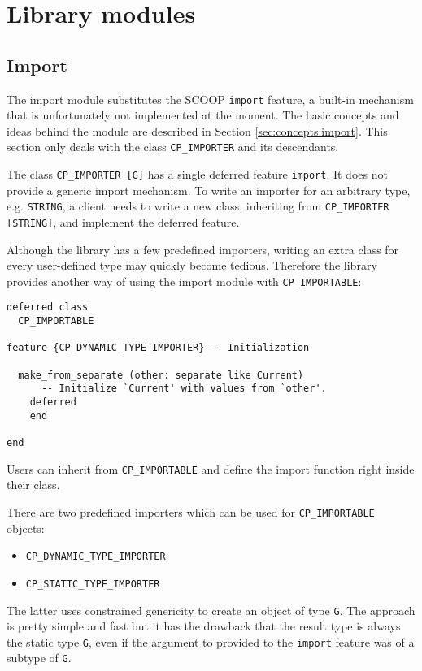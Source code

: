 \section{Library modules}
\label{sec:modules}

\subsection{Import}
\label{sec:modules:import}

The import module substitutes the SCOOP \lstinline!import! feature, a built-in mechanism that is unfortunately not implemented at the moment.
The basic concepts and ideas behind the module are described in Section \ref{sec:concepts:import}.
This section only deals with the class \lstinline!CP_IMPORTER! and its descendants.

The class \lstinline!CP_IMPORTER [G]! has a single deferred feature \lstinline!import!.
It does not provide a generic import mechanism.
To write an importer for an arbitrary type, e.g. \lstinline!STRING!, a client needs to write a new class, inheriting from \lstinline!CP_IMPORTER [STRING]!, and implement the deferred feature.

Although the library has a few predefined importers, writing an extra class for every user-defined type may quickly become tedious.
Therefore the library provides another way of using the import module with \lstinline!CP_IMPORTABLE!:

\begin{lstlisting}[captionpos=b, caption={The deferred class CP\_IMPORTABLE.}]
deferred class
  CP_IMPORTABLE

feature {CP_DYNAMIC_TYPE_IMPORTER} -- Initialization

  make_from_separate (other: separate like Current)
      -- Initialize `Current' with values from `other'.
    deferred
    end

end
\end{lstlisting}

Users can inherit from \lstinline!CP_IMPORTABLE! and define the import function right inside their class.

There are two predefined importers which can be used for \lstinline!CP_IMPORTABLE! objects: 
\begin{itemize}
 \item \lstinline!CP_DYNAMIC_TYPE_IMPORTER!
 \item \lstinline!CP_STATIC_TYPE_IMPORTER!
\end{itemize}
The latter uses constrained genericity to create an object of type \lstinline!G!.
The approach is pretty simple and fast but it has the drawback that the result type is always the static type \lstinline!G!, even if the argument to provided to the \lstinline!import! fea\-ture was of a subtype of \lstinline!G!.

